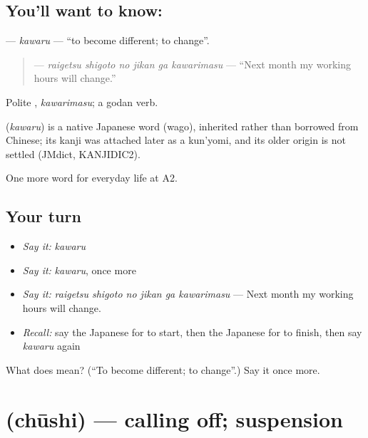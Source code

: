 \subsection*{You'll want to know: }
\textbf{} — \emph{kawaru} — \textquotedblleft{}to become different; to change\textquotedblright{}.

\begin{quote}
\textbf{   } — \emph{raigetsu shigoto no jikan ga kawarimasu} — \textquotedblleft{}Next month my working hours will change.\textquotedblright{}
\end{quote}

Polite \textbf{}, \emph{kawarimasu}; a godan verb.

\begin{cousinweb}
\textbf{} (\emph{kawaru}) is a native Japanese word (wago), inherited rather than borrowed from Chinese; its kanji was attached later as a kun'yomi, and its older origin is not settled (JMdict, KANJIDIC2).
\end{cousinweb}

\begin{grammarlens}[title={What you've built}]
One more word for everyday life at A2.
\end{grammarlens}

\subsection*{Your turn}
\begin{itemize}
\raggedright
  \item \emph{Say it:} \emph{kawaru}
  \item \emph{Say it:} \emph{kawaru}, once more
  \item \emph{Say it:} \emph{raigetsu shigoto no jikan ga kawarimasu} — Next month my working hours will change.
  \item \emph{Recall:} say the Japanese for to start, then the Japanese for to finish, then say \emph{kawaru} again
\end{itemize}

\begin{tcolorbox}[breakable,colback=teal!4,colframe=teal!35!black,title={Before you move on}]
What does  mean? (\textquotedblleft{}To become different; to change\textquotedblright{}.) Say it once more.
\end{tcolorbox}
\section[\texorpdfstring{\ja{ちゅうし} (chūshi)}{ちゅうし (chūshi)}]{ (chūshi) — calling off; suspension}

